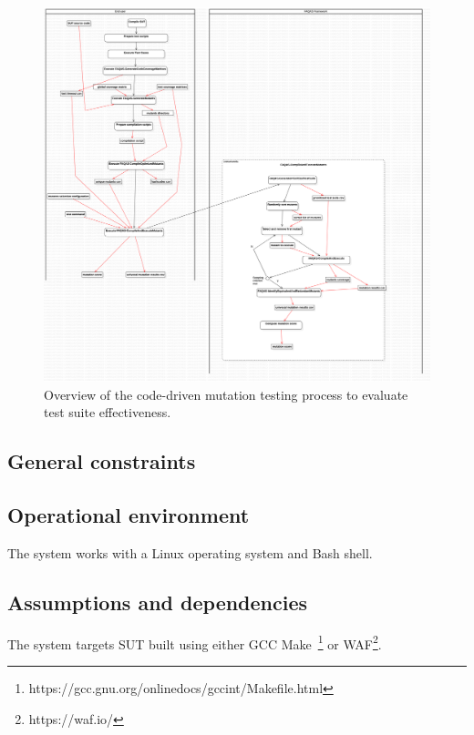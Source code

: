 \begin{figure}[t]
  \centering
	\includegraphics[width=15cm]{images/png/Activity1!CodeDrivenTestSuiteEvaluation_1.png}
      \caption{Overview of the code-driven mutation testing process to evaluate test suite effectiveness.}
      \label{fig:process:codeDriven:evaluation}
\end{figure}


\clearpage

\subsection{General constraints}


\clearpage

\subsection{Operational environment}

\RQ{} The system works with a Linux operating system and Bash shell.



\subsection{Assumptions and dependencies}

\RQ{} The system targets SUT built using either GCC Make~\footnote{https://gcc.gnu.org/onlinedocs/gccint/Makefile.html} or WAF\footnote{https://waf.io/}.

